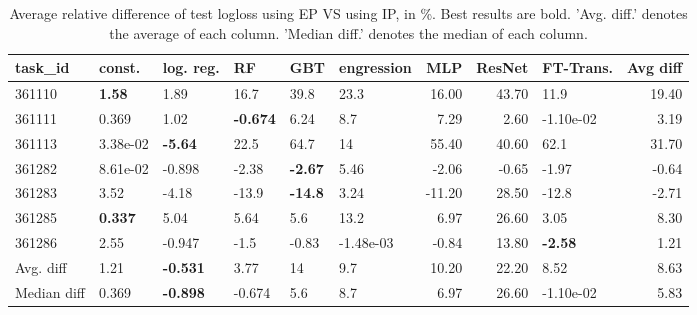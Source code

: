 \begin{table}[ht!]
\centering
\begingroup\footnotesize
\begin{tabular}{llllllrrlr}
  \hline
\hline
task\_id & const. & log. reg. & RF & GBT & engression & MLP & ResNet & FT-Trans. & Avg diff \\ 
  \hline
361110 & \textbf{1.58} & 1.89 & 16.7 & 39.8 & 23.3 & 16.00 & 43.70 & 11.9 & 19.40 \\ 
  361111 & 0.369 & 1.02 & \textbf{-0.674} & 6.24 & 8.7 & 7.29 & 2.60 & -1.10e-02 & 3.19 \\ 
  361113 &  3.38e-02 & \textbf{-5.64} & 22.5 & 64.7 & 14 & 55.40 & 40.60 & 62.1 & 31.70 \\ 
  361282 &  8.61e-02 & -0.898 & -2.38 & \textbf{-2.67} & 5.46 & -2.06 & -0.65 & -1.97 & -0.64 \\ 
  361283 & 3.52 & -4.18 & -13.9 & \textbf{-14.8} & 3.24 & -11.20 & 28.50 & -12.8 & -2.71 \\ 
  361285 & \textbf{0.337} & 5.04 & 5.64 & 5.6 & 13.2 & 6.97 & 26.60 & 3.05 & 8.30 \\ 
  361286 & 2.55 & -0.947 & -1.5 & -0.83 & -1.48e-03 & -0.84 & 13.80 & \textbf{-2.58} & 1.21 \\ 
   \hline
Avg. diff & 1.21 & \textbf{-0.531} & 3.77 & 14 & 9.7 & 10.20 & 22.20 & 8.52 & 8.63 \\ 
  Median diff & 0.369 & \textbf{-0.898} & -0.674 & 5.6 & 8.7 & 6.97 & 26.60 & -1.10e-02 & 5.83 \\ 
   \hline
\hline
\end{tabular}
\endgroup
\caption{Average relative difference of test logloss using EP VS using IP, in \%. 
                  Best results are bold. 
                  'Avg. diff.' denotes the average of each column.
                  'Median diff.' denotes the median of each column.} 
\label{TABLES/table_results_logloss_gower_num_and_cat_features_EP_VS_IP}
\end{table}
